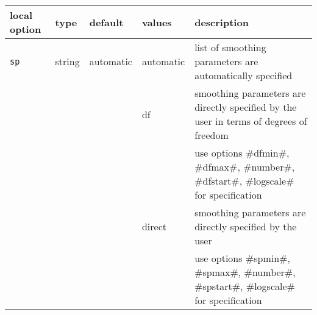 
\begin{sidewaystable}[ht] \footnotesize
 \begin{center}
 \begin{tabular}{|l|l|l|l|l|}%
 \hline
 {\bf local option} & {\bf type} & {\bf default} & {\bf values} & {\bf description} \\
 \hline \hline
 {\tt sp}        & string                 & automatic & automatic & list of smoothing parameters are automatically specified  \\
                 &                         &       & df  & smoothing parameters are directly specified by the user in terms of  degrees of freedom \\
                 &                         &       &   & use options #dfmin#, #dfmax#, #number#, #dfstart#, #logscale# for specification  \\
                 &                         &       & direct  & smoothing parameters are directly specified by the user  \\
                 &                         &       &   & use options #spmin#, #spmax#, #number#, #spstart#, #logscale# for specification  \\


\end{tabular}
\end{center}
\end{sidewaystable}
